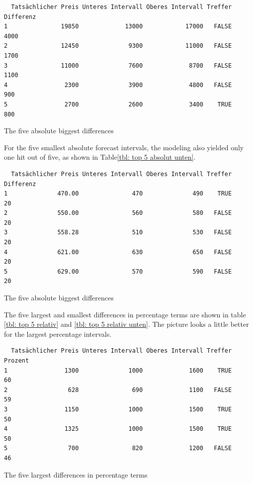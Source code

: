 \begin{table}[H]
	\begin{verbatim}
  Tatsächlicher Preis Unteres Intervall Oberes Intervall Treffer Differenz
1               19850             13000            17000   FALSE      4000
2               12450              9300            11000   FALSE      1700
3               11000              7600             8700   FALSE      1100
4                2300              3900             4800   FALSE       900
5                2700              2600             3400    TRUE       800
	\end{verbatim}
\caption{The five absolute biggest differences}
\label{tbl: top 5 absolut}
\end{table}

		For the five smallest absolute forecast intervals, the modeling also yielded only one hit out of five, as shown in Table\ref{tbl: top 5 absolut unten}.

\begin{table}[H]
	\begin{verbatim}
  Tatsächlicher Preis Unteres Intervall Oberes Intervall Treffer Differenz
1              470.00               470              490    TRUE        20
2              550.00               560              580   FALSE        20
3              558.28               510              530   FALSE        20
4              621.00               630              650   FALSE        20
5              629.00               570              590   FALSE        20
	\end{verbatim}
	\caption{The five absolute biggest differences}
	\label{tbl: top 5 absolut unten}
\end{table}

	The five largest and smallest differences in percentage terms are shown in table  \ref{tbl: top 5 relativ} and \ref{tbl: top 5 relativ unten}. The picture looks a little better for the largest percentage intervals. 

\begin{table}[H]
	\begin{verbatim}
  Tatsächlicher Preis Unteres Intervall Oberes Intervall Treffer Prozent
1                1300              1000             1600    TRUE      60
2                 628               690             1100   FALSE      59
3                1150              1000             1500    TRUE      50
4                1325              1000             1500    TRUE      50
5                 700               820             1200   FALSE      46
	\end{verbatim}
	\caption{The five largest differences in percentage terms}
	\label{tbl: top 5 relativ}
\end{table}


